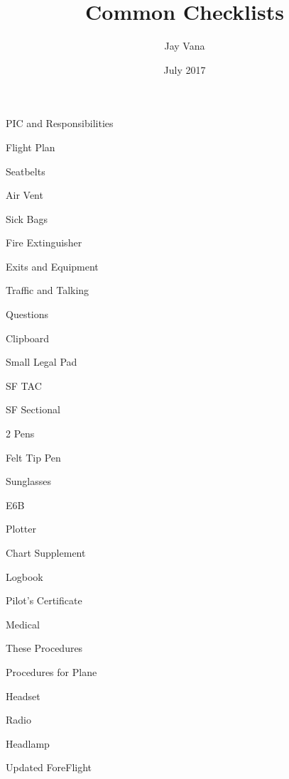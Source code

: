 \documentclass{article}
\title{Common Checklists}
\author{Jay Vana}
\date{July 2017}
\begin{document}
  


  \begin{multicols*}{2}


    \begin{packlist}
      \item PIC and Responsibilities
      \item Flight Plan
      \item Seatbelts
      \item Air Vent
      \item Sick Bags
      \item Fire Extinguisher
      \item Exits and Equipment
      \item Traffic and Talking
      \item Questions
    \end{packlist}


    \begin{packlist}
      \item Clipboard
      \item Small Legal Pad
      \item SF TAC
      \item SF Sectional
      \item 2 Pens
      \item Felt Tip Pen
      \item Sunglasses
      \item E6B
      \item Plotter
      \item Chart Supplement
      \item Logbook
      \item Pilot's Certificate
      \item Medical
      \item These Procedures
      \item Procedures for Plane
      \item Headset
      \item Radio
      \item Headlamp
      \item Updated ForeFlight
    \end{packlist}



\end{multicols*}
\end{document}
